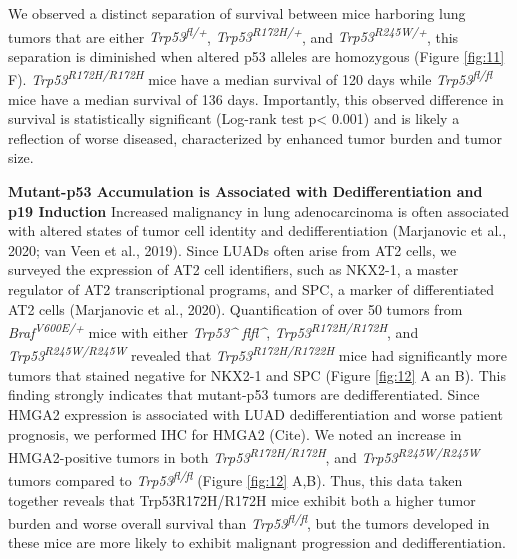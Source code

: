 We observed a distinct separation of survival between mice harboring lung tumors that are either \emph{Trp53\textsuperscript{fl/+}}, \emph{Trp53\textsuperscript{R172H/+}}, and \emph{Trp53\textsuperscript{R245W/+}}, this separation is diminished when altered p53 alleles are homozygous (Figure \ref{fig:11} F). \emph{Trp53\textsuperscript{R172H/R172H}} mice have a median survival of 120 days while \emph{Trp53\textsuperscript{fl/fl}} mice have a median survival of 136 days. Importantly, this observed difference in survival is statistically significant (Log-rank test p\textless{} 0.001) and is likely a reflection of worse diseased, characterized by enhanced tumor burden and tumor size.

\textbf{Mutant-p53 Accumulation is Associated with Dedifferentiation and p19 Induction}
Increased malignancy in lung adenocarcinoma is often associated with altered states of tumor cell identity and dedifferentiation (Marjanovic et al., 2020; van Veen et al., 2019). Since LUADs often arise from AT2 cells, we surveyed the expression of AT2 cell identifiers, such as NKX2-1, a master regulator of AT2 transcriptional programs, and SPC, a marker of differentiated AT2 cells (Marjanovic et al., 2020). Quantification of over 50 tumors from \emph{Braf\textsuperscript{V600E/+}} mice with either \emph{Trp53\^{} flfl\^{}}, \emph{Trp53\textsuperscript{R172H/R172H}}, and \emph{Trp53\textsuperscript{R245W/R245W}} revealed that \emph{Trp53\textsuperscript{R172H/R1722H}} mice had significantly more tumors that stained negative for NKX2-1 and SPC (Figure \ref{fig:12} A an B). This finding strongly indicates that mutant-p53 tumors are dedifferentiated. Since HMGA2 expression is associated with LUAD dedifferentiation and worse patient prognosis, we performed IHC for HMGA2 (Cite). We noted an increase in HMGA2-positive tumors in both \emph{Trp53\textsuperscript{R172H/R172H}}, and \emph{Trp53\textsuperscript{R245W/R245W}} tumors compared to \emph{Trp53\textsuperscript{fl/fl}} (Figure \ref{fig:12} A,B). Thus, this data taken together reveals that Trp53R172H/R172H mice exhibit both a higher tumor burden and worse overall survival than \emph{Trp53\textsuperscript{fl/fl}}, but the tumors developed in these mice are more likely to exhibit malignant progression and dedifferentiation.

